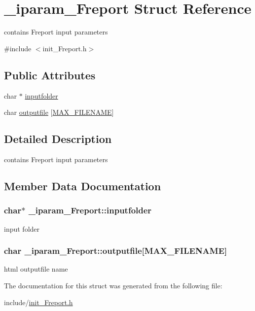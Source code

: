 \hypertarget{struct__iparam__Freport}{\section{\+\_\+iparam\+\_\+\+Freport Struct Reference}
\label{struct__iparam__Freport}
}


contains Freport input parameters  




{\ttfamily \#include $<$init\+\_\+\+Freport.\+h$>$}

\subsection*{Public Attributes}
\begin{DoxyCompactItemize}
\item 
char $\ast$ \hyperlink{struct__iparam__Freport_a0e65baa185928cd40bb6aabb14c0f189}{inputfolder}
\item 
char \hyperlink{struct__iparam__Freport_a5c86fdc95e6c199dede6c269b8ea1417}{outputfile} \mbox{[}\hyperlink{defines_8h_abe0ec333b60117063f9b9fd9f849cb08}{M\+A\+X\+\_\+\+F\+I\+L\+E\+N\+A\+M\+E}\mbox{]}
\end{DoxyCompactItemize}


\subsection{Detailed Description}
contains Freport input parameters 

\subsection{Member Data Documentation}
\hypertarget{struct__iparam__Freport_a0e65baa185928cd40bb6aabb14c0f189}{
\subsubsection[{inputfolder}]{\setlength{\rightskip}{0pt plus 5cm}char$\ast$ \+\_\+iparam\+\_\+\+Freport\+::inputfolder}}\label{struct__iparam__Freport_a0e65baa185928cd40bb6aabb14c0f189}
input folder \hypertarget{struct__iparam__Freport_a5c86fdc95e6c199dede6c269b8ea1417}{
\subsubsection[{outputfile}]{\setlength{\rightskip}{0pt plus 5cm}char \+\_\+iparam\+\_\+\+Freport\+::outputfile\mbox{[}{\bf M\+A\+X\+\_\+\+F\+I\+L\+E\+N\+A\+M\+E}\mbox{]}}}\label{struct__iparam__Freport_a5c86fdc95e6c199dede6c269b8ea1417}
html outputfile name 

The documentation for this struct was generated from the following file\+:\begin{DoxyCompactItemize}
\item 
include/\hyperlink{init__Freport_8h}{init\+\_\+\+Freport.\+h}\end{DoxyCompactItemize}
